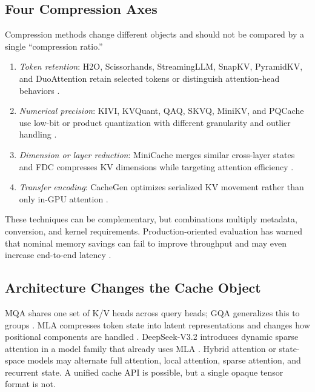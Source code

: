 \documentclass[conference,10pt]{IEEEtran}
\begin{document}
\subsection{Four Compression Axes}

Compression methods change different objects and should not be compared by a single ``compression ratio.''

\begin{enumerate}
    \item \emph{Token retention}: H2O, Scissorhands, StreamingLLM, SnapKV, PyramidKV, and DuoAttention retain selected tokens or distinguish attention-head behaviors \cite{zhang2023heavyhitter,liu2023scissorhands,xiao2023efficient,li2024snapkv,cai2024pyramidkv,xiao2024duoattention}.
    \item \emph{Numerical precision}: KIVI, KVQuant, QAQ, SKVQ, MiniKV, and PQCache use low-bit or product quantization with different granularity and outlier handling \cite{liu2024kivi,hooper2024kvquant,dong2024quality,duanmu2024skvq,sharma2024minikv,zhang2024pqcache}.
    \item \emph{Dimension or layer reduction}: MiniCache merges similar cross-layer states and FDC compresses KV dimensions while targeting attention efficiency \cite{liu2024minicache,zhang2024fast}.
    \item \emph{Transfer encoding}: CacheGen optimizes serialized KV movement rather than only in-GPU attention \cite{liu2023cachegen}.
\end{enumerate}

These techniques can be complementary, but combinations multiply metadata, conversion, and kernel requirements. Production-oriented evaluation has warned that nominal memory savings can fail to improve throughput and may even increase end-to-end latency \cite{gao2025rethinking}.

\subsection{Architecture Changes the Cache Object}

MQA shares one set of K/V heads across query heads; GQA generalizes this to groups \cite{shazeer2019fast,ainslie2023training}. MLA compresses token state into latent representations and changes how positional components are handled \cite{deepseekai2024deepseekv,deepseekai2024deepseekv2}. DeepSeek-V3.2 introduces dynamic sparse attention in a model family that already uses MLA \cite{deepseekai2025deepseekv}. Hybrid attention or state-space models may alternate full attention, local attention, sparse attention, and recurrent state. A unified cache API is possible, but a single opaque tensor format is not.
\end{document}
